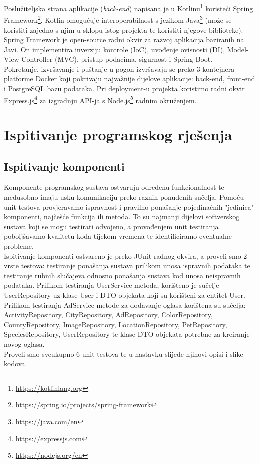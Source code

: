 Poslužiteljska strana aplikacije (\textit{back-end}) napisana je u Kotlinu\footnote{\url{https://kotlinlang.org}} koristeći Spring Framework\footnote{\url{https://spring.io/projects/spring-framework}}. Kotlin omogućuje interoperabilnost s jezikom Java\footnote{\url{https://java.com/en}} (može se koristiti zajedno s njim u sklopu istog projekta te koristiti njegove biblioteke). Spring Framework je open-source radni okvir za razvoj aplikacija baziranih na Javi. On implementira inverziju kontrole (IoC), uvođenje ovisnosti (DI), Model-View-Controller (MVC), pristup podacima, sigurnost i Spring Boot. \\
Pokretanje, izvršavanje i puštanje u pogon izvršavaju se preko 3 kontejnera platforme Docker koji pokrivaju najvažnije dijelove aplikacije: back-end, front-end i PostgreSQL bazu podataka. Pri deployment-u projekta koristimo radni okvir Express.js\footnote{\url{https://expressjs.com}} za izgradnju API-ja s Node.js\footnote{\url{https://nodejs.org/en}} radnim okruženjem.

			
			\eject 
		
	
		\section{Ispitivanje programskog rješenja}
	
			
			\subsection{Ispitivanje komponenti}
			
			Komponente programskog sustava ostvaruju određenu funkcionalnost te međusobno imaju usku komunikaciju preko raznih ponuđenih sučelja. Pomoću unit testova provjeravamo ispravnost i pravilno ponašanje pojedinačnih "jedinica" komponenti, najčešće funkcija ili metoda. To su najmanji dijelovi softverskog sustava koji se mogu testirati odvojeno, a provođenjem unit testiranja poboljšavamo kvalitetu koda tijekom vremena te identificiramo eventualne probleme. \\
			
Ispitivanje komponenti ostvareno je preko JUnit radnog okvira, a proveli smo 2 vrste testova: testiranje ponašanja sustava prilikom unosa ispravnih podataka te testiranje rubnih slučajeva odnosno ponašanja sustava kod unosa neispravnih podataka.  Prilikom testiranja UserService metoda, korišteno je sučelje UserRepository uz klase User i DTO objekata koji su korišteni za entitet User. Prilikom testiranja AdService metode za dodavanje oglasa korištena su sučelja: ActivityRepository, CityRepository, AdRepository, ColorRepository, CountyRepository, ImageRepository, LocationRepository, PetRepository, SpeciesRepository, UserRepository te klase DTO objekata potrebne za kreiranje novog oglasa.\\
Proveli smo sveukupno 6 unit testova te u nastavku slijede njihovi opisi i slike kodova.

